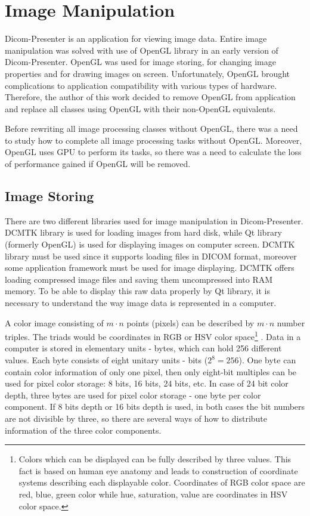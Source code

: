 \chapter{Image Manipulation}
\vspace{-10mm}

Dicom-Presenter is an application for viewing image data. Entire image manipulation was solved with use of OpenGL library in an early version of Dicom-Presenter. OpenGL was used for image storing, for changing image properties and for drawing images on screen. Unfortunately, OpenGL brought complications to application compatibility with various types of hardware. Therefore, the author of this work decided to remove OpenGL from application and replace all classes using OpenGL with their non-OpenGL equivalents. 

Before rewriting all image processing classes without OpenGL, there was a need to study how to complete all image processing tasks without OpenGL. Moreover, OpenGL uses GPU to perform its tasks, so there was a need to calculate the loss of performance gained if OpenGL will be removed. 

\section{Image Storing}
\label{rawdata}
There are two different libraries used for image manipulation in Dicom-Presenter. DCMTK library is used for loading images from hard disk, while Qt library (formerly OpenGL) is used for displaying images on computer screen. DCMTK library must be used since it supports loading files in DICOM format, moreover some application framework must be used for image displaying. DCMTK offers loading compressed image files and saving them uncompressed into RAM memory. To be able to display this raw data properly by Qt library, it is necessary to understand the way image data is represented in a computer. 

A color image consisting of $m \cdot n$ points (pixels) can be described by $m \cdot n$ number triples. The triads would be coordinates in RGB or HSV color space\footnote{Colors which can be displayed can be fully described by three values. This fact is based on human eye anatomy and leads to construction of coordinate systems describing each displayable color. Coordinates of RGB color space are red, blue, green color while hue, saturation, value are coordinates in HSV color space.} \cite[page~211]{imageprocessingintroduction}. Data in a computer is stored in elementary units - bytes, which can hold 256 different values. Each byte consists of eight unitary units - bits ($2^8 = 256 $). One byte can contain color information of only one pixel, then only eight-bit multiples can be used for pixel color storage: 8 bits, 16 bits, 24 bits, etc.\cite[page~208]{colorphotography} In case of 24 bit color depth, three bytes are used for pixel color storage - one byte per color component. If 8 bits depth or 16 bits depth is used, in both cases the bit numbers are not divisible by three, so there are several ways of how to distribute information of the three color components.
 
